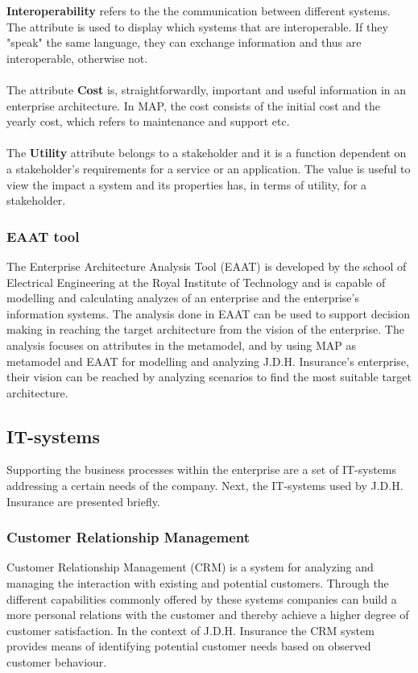 %
\textbf{Interoperability} refers to the the communication between different systems. The attribute is used to display which systems that are interoperable. If they "speak" the same language, they can exchange information and thus are interoperable, otherwise not.\\\\
%
The attribute \textbf{Cost} is, straightforwardly, important and useful information in an enterprise architecture. In MAP, the cost consists of the initial cost and the yearly cost, which refers to maintenance and support etc.\\\\
%
The \textbf{Utility} attribute belongs to a stakeholder and it is a function dependent on a stakeholder's requirements for a service or an application. The value is useful to view the impact a system and its properties has, in terms of utility, for a stakeholder.
%
\subsubsection{EAAT tool}
\label{sec:eaat}
The Enterprise Architecture Analysis Tool (EAAT) is developed by the school of Electrical Engineering at the Royal Institute of Technology and is capable of modelling and calculating analyzes of an enterprise and the enterprise's information systems. The analysis done in EAAT can be used to support decision making in reaching the target architecture from the vision of the enterprise. The analysis focuses on attributes in the metamodel, and by using MAP as metamodel and EAAT for modelling and analyzing J.D.H. Insurance's enterprise, their vision can be reached by analyzing scenarios to find the most suitable target architecture.
%
\subsection{IT-systems}
\label{sec:it_systems}
Supporting the business processes within the enterprise are a set of IT-systems addressing a certain needs of the company. Next, the IT-systems used by J.D.H. Insurance are presented briefly.
%
\subsubsection{Customer Relationship Management}
\label{sec:crm}
Customer Relationship Management (CRM) is a system for analyzing and managing the interaction with existing and potential customers. Through the different capabilities commonly offered by these systems companies can build a more personal relations with the customer and thereby achieve a higher degree of customer satisfaction. In the context of J.D.H. Insurance the CRM system provides means of identifying potential customer needs based on observed customer behaviour.
